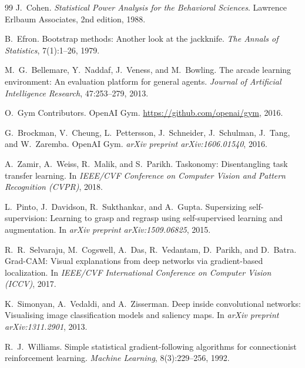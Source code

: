 \documentclass[12pt,a4paper,openany]{report}
\begin{document}
\begin{thebibliography}{99}
 J.~Cohen. \textit{Statistical Power Analysis for the Behavioral Sciences}. Lawrence Erlbaum Associates, 2nd edition, 1988.

 B.~Efron. Bootstrap methods: Another look at the jackknife. \textit{The Annals of Statistics}, 7(1):1--26, 1979.


 M.~G.~Bellemare, Y.~Naddaf, J.~Veness, and M.~Bowling. The arcade learning environment: An evaluation platform for general agents. \textit{Journal of Artificial Intelligence Research}, 47:253--279, 2013.

 O.~Gym Contributors. OpenAI Gym. \url{https://github.com/openai/gym}, 2016.

 G.~Brockman, V.~Cheung, L.~Pettersson, J.~Schneider, J.~Schulman, J.~Tang, and W.~Zaremba. OpenAI Gym. \textit{arXiv preprint arXiv:1606.01540}, 2016.


 A.~Zamir, A.~Weiss, R.~Malik, and S.~Parikh. Taskonomy: Disentangling task transfer learning. In \textit{IEEE/CVF Conference on Computer Vision and Pattern Recognition (CVPR)}, 2018.

 L.~Pinto, J.~Davidson, R.~Sukthankar, and A.~Gupta. Supersizing self-supervision: Learning to grasp and regrasp using self-supervised learning and augmentation. In \textit{arXiv preprint arXiv:1509.06825}, 2015.


 R.~R.~Selvaraju, M.~Cogswell, A.~Das, R.~Vedantam, D.~Parikh, and D.~Batra. Grad-CAM: Visual explanations from deep networks via gradient-based localization. In \textit{IEEE/CVF International Conference on Computer Vision (ICCV)}, 2017.

 K.~Simonyan, A.~Vedaldi, and A.~Zisserman. Deep inside convolutional networks: Visualising image classification models and saliency maps. In \textit{arXiv preprint arXiv:1311.2901}, 2013.


 R.~J.~Williams. Simple statistical gradient-following algorithms for connectionist reinforcement learning. \textit{Machine Learning}, 8(3):229--256, 1992.


\end{thebibliography}
\end{document}
